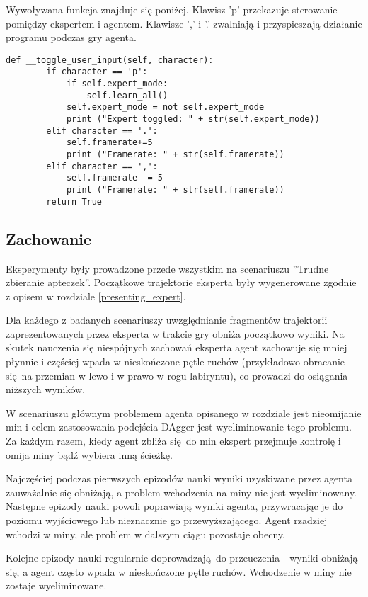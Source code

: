 Wywoływana funkcja znajduje się poniżej. Klawisz 'p' przekazuje sterowanie pomiędzy ekspertem i agentem. Klawisze ',' i '.' zwalniają i przyspieszają działanie programu podczas gry agenta.

\begin{lstlisting}[language=iPython]
    def __toggle_user_input(self, character):
        if character == 'p':
            if self.expert_mode:
                self.learn_all()
            self.expert_mode = not self.expert_mode
            print ("Expert toggled: " + str(self.expert_mode))
        elif character == '.':
            self.framerate+=5
            print ("Framerate: " + str(self.framerate))
        elif character == ',':
            self.framerate -= 5
            print ("Framerate: " + str(self.framerate))
        return True
\end{lstlisting}

\subsection{Zachowanie}
Eksperymenty były prowadzone przede wszystkim na scenariuszu ''Trudne zbieranie apteczek''. Początkowe trajektorie eksperta były wygenerowane zgodnie z opisem w rozdziale \ref{presenting_expert}.

Dla każdego z badanych scenariuszy uwzględnianie fragmentów trajektorii zaprezentowanych przez eksperta w trakcie gry obniża początkowo wyniki. Na skutek nauczenia się niespójnych zachowań eksperta agent zachowuje się mniej płynnie i częściej wpada w nieskończone pętle ruchów (przykładowo obracanie się na przemian w lewo i w prawo w rogu labiryntu), co prowadzi do osiągania niższych wyników.

W scenariuszu  głównym problemem agenta opisanego w rozdziale  jest nieomijanie min i celem zastosowania podejścia DAgger jest wyeliminowanie tego problemu. Za każdym razem, kiedy agent zbliża się do min ekspert przejmuje kontrolę i omija miny bądź wybiera inną ścieżkę.

Najczęściej podczas pierwszych epizodów nauki wyniki uzyskiwane przez agenta zauważalnie się obniżają, a problem wchodzenia na miny nie jest wyeliminowany. Następne epizody nauki powoli poprawiają wyniki agenta, przywracając je do poziomu wyjściowego lub nieznacznie go przewyższającego. Agent rzadziej wchodzi w miny, ale problem w dalszym ciągu pozostaje obecny. 

Kolejne epizody nauki regularnie doprowadzają do przeuczenia - wyniki obniżają się, a agent często wpada w nieskończone pętle ruchów. Wchodzenie w miny nie zostaje wyeliminowane.

